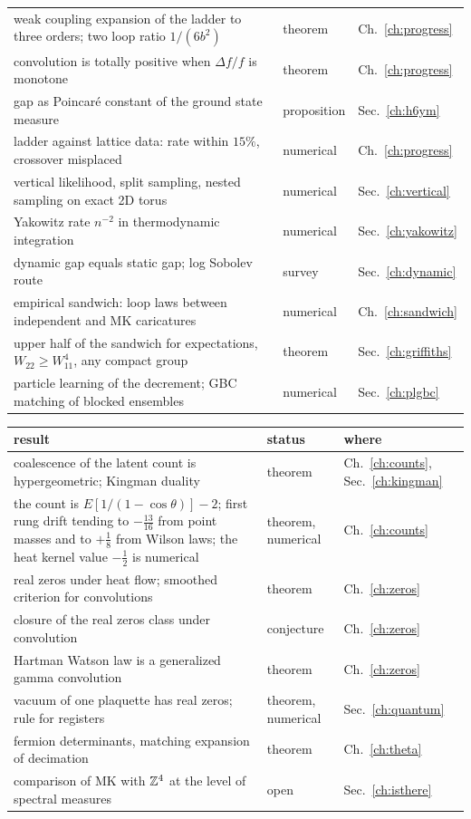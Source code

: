 \begin{center}
\begin{tabular}{p{2.55in}p{0.85in}p{0.6in}}
weak coupling expansion of the ladder to three orders; two loop ratio $1/(6b^2)$ & theorem & Ch.~\ref{ch:progress} \\
convolution is totally positive when $\Delta f/f$ is monotone & theorem & Ch.~\ref{ch:progress} \\
gap as Poincar\'e constant of the ground state measure & proposition & Sec.~\ref{ch:h6ym} \\
ladder against lattice data: rate within $15\%$, crossover misplaced & numerical & Ch.~\ref{ch:progress} \\
vertical likelihood, split sampling, nested sampling on exact 2D torus & numerical & Sec.~\ref{ch:vertical} \\
Yakowitz rate $n^{-2}$ in thermodynamic integration & numerical & Sec.~\ref{ch:yakowitz} \\
dynamic gap equals static gap; log Sobolev route & survey & Sec.~\ref{ch:dynamic} \\
empirical sandwich: loop laws between independent and MK caricatures & numerical & Ch.~\ref{ch:sandwich} \\
upper half of the sandwich for expectations, $W_{22}\ge W_{11}^4$, any compact group & theorem & Sec.~\ref{ch:griffiths} \\
particle learning of the decrement; GBC matching of blocked ensembles & numerical & Sec.~\ref{ch:plgbc} \\
\bottomrule
\end{tabular}
\end{center}

\begin{center}
\scriptsize
\begin{tabular}{p{2.55in}p{0.85in}p{0.6in}}
\toprule
result & status & where \\ \midrule
coalescence of the latent count is hypergeometric; Kingman duality & theorem & Ch.~\ref{ch:counts}, Sec.~\ref{ch:kingman} \\
the count is $E[1/(1-\cos\theta)]-2$; first rung drift tending to $-\frac{13}{16}$ from point masses and to $+\frac18$ from Wilson laws; the heat kernel value $-\frac12$ is numerical & theorem, numerical & Ch.~\ref{ch:counts} \\
real zeros under heat flow; smoothed criterion for convolutions & theorem & Ch.~\ref{ch:zeros} \\
closure of the real zeros class under convolution & conjecture & Ch.~\ref{ch:zeros} \\
Hartman Watson law is a generalized gamma convolution & theorem & Ch.~\ref{ch:zeros} \\
vacuum of one plaquette has real zeros; rule for registers & theorem, numerical & Sec.~\ref{ch:quantum} \\
fermion determinants, matching expansion of decimation & theorem & Ch.~\ref{ch:theta} \\
comparison of MK with $\mathbb{Z}^4$ at the level of spectral measures & open & Sec.~\ref{ch:isthere} \\
\bottomrule
\end{tabular}
\end{center}

